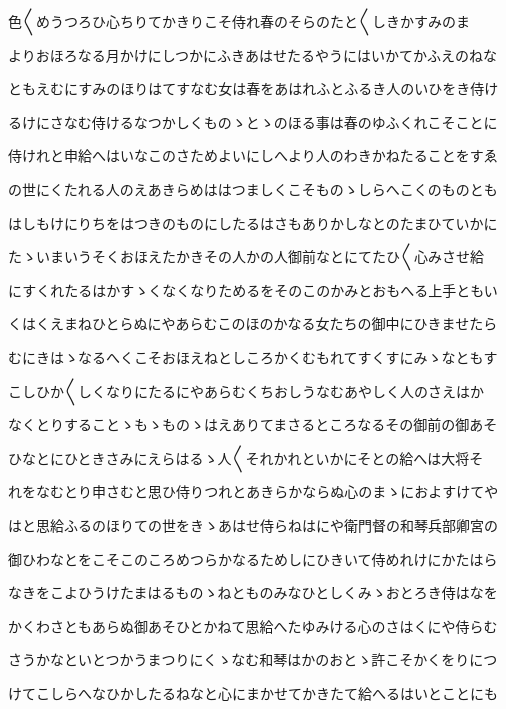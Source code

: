 \documentclass[a4paper,11pt,landscape]{ltjtarticle}
\begin{document}
\par\medskip
色〱めうつろひ心ちりてかきりこそ侍れ春のそらのたと〱しきかすみのま
\par\medskip
よりおほろなる月かけにしつかにふきあはせたるやうにはいかてかふえのねな
\par\medskip
ともえむにすみのほりはてすなむ女は春をあはれふとふるき人のいひをき侍け
\par\medskip
るけにさなむ侍けるなつかしくものゝとゝのほる事は春のゆふくれこそことに
\par\medskip
侍けれと申給へはいなこのさためよいにしへより人のわきかねたることをすゑ
\par\medskip
の世にくたれる人のえあきらめははつましくこそものゝしらへこくのものとも
\par\medskip
はしもけにりちをはつきのものにしたるはさもありかしなとのたまひていかに
\par\medskip
たゝいまいうそくおほえたかきその人かの人御前なとにてたひ〱心みさせ給
\par\medskip
にすくれたるはかすゝくなくなりためるをそのこのかみとおもへる上手ともい
\par\medskip
くはくえまねひとらぬにやあらむこのほのかなる女たちの御中にひきませたら
\par\medskip
むにきはゝなるへくこそおほえねとしころかくむもれてすくすにみゝなともす
\par\medskip
こしひか〱しくなりにたるにやあらむくちおしうなむあやしく人のさえはか
\par\medskip
なくとりすることゝもゝものゝはえありてまさるところなるその御前の御あそ
\par\medskip
ひなとにひときさみにえらはるゝ人〱それかれといかにそとの給へは大将そ
\par\medskip
れをなむとり申さむと思ひ侍りつれとあきらかならぬ心のまゝにおよすけてや
\par\medskip
はと思給ふるのほりての世をきゝあはせ侍らねはにや衛門督の和琴兵部卿宮の
\par\medskip
御ひわなとをこそこのころめつらかなるためしにひきいて侍めれけにかたはら
\par\medskip
なきをこよひうけたまはるものゝねとものみなひとしくみゝおとろき侍はなを
\par\medskip
かくわさともあらぬ御あそひとかねて思給へたゆみける心のさはくにや侍らむ
\par\medskip
さうかなといとつかうまつりにくゝなむ和琴はかのおとゝ許こそかくをりにつ
\par\medskip
けてこしらへなひかしたるねなと心にまかせてかきたて給へるはいとことにも
\par\medskip
\end{document}
